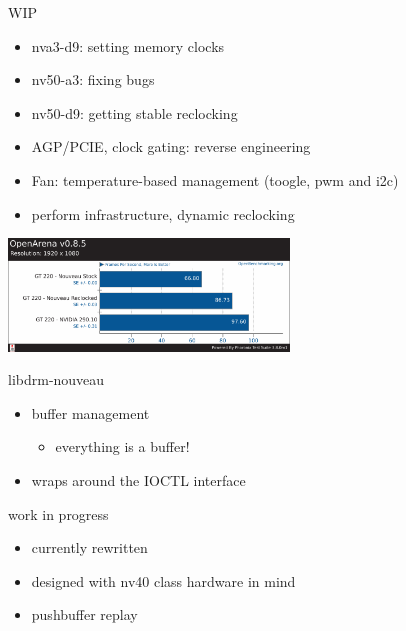 \documentclass[11pt,english,compress]{beamer}
\begin{document}
		\begin{frame}
			\begin{block}{WIP}
				\begin{itemize}
					\item nva3-d9: setting memory clocks
					\item nv50-a3: fixing bugs
					\item nv50-d9: getting stable reclocking
					\item AGP/PCIE, clock gating: reverse engineering
					\item Fan: temperature-based management (toogle, pwm and i2c)
					\item perform infrastructure, dynamic reclocking
				\end{itemize}
			\end{block}

			\begin{center}
				\includegraphics[height=3cm]{imgs/gt220_openarena_bench.pdf}
			\end{center}
		\end{frame}

		\begin{frame}
			\begin{block}{libdrm-nouveau}
				\begin{itemize}
					\item buffer management
						\begin{itemize}
							\item everything is a buffer!
						\end{itemize}
					\item wraps around the IOCTL interface
				\end{itemize}
			\end{block}
			\begin{block}{work in progress}
				\begin{itemize}
					\item currently rewritten
					\item designed with nv40 class hardware in mind
					\item pushbuffer replay
				\end{itemize}
			\end{block}
		\end{frame}
\end{document}
